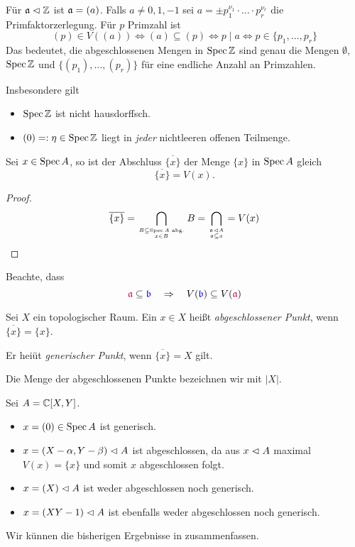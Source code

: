 \begin{beispiel}[$\Spec \Z$]
	Für $\mathfrak{a} \vartriangleleft \mathbb{Z}$ ist $\mathfrak{a} = (a)$. Falls $a \neq 0,1,-1$ sei
	$a = \pm p_1^{\nu_1} \cdot \dots \cdot p_r^{\nu_r}$ die 
	Primfaktorzerlegung. Für $p$ Primzahl ist
	\[
		(p) \in V((a)) \Leftrightarrow
		(a) \subseteq (p) \Leftrightarrow
		p \mid a \Leftrightarrow
		p \in \{p_1,\ldots, p_r\}
	\]
	Das bedeutet, die abgeschlossenen Mengen in $\Spec \Z$ sind genau die 
	Mengen $\emptyset$, $\Spec \Z$ und
	$\{(p_1), \ldots, (p_r)\}$ für eine endliche Anzahl an Primzahlen.
	
	Insbesondere gilt
	\begin{itemize}
	  \item $\Spec\Z$ ist nicht hausdorffsch.
	  \item $(0) =: \eta \in \operatorname{Spec}\mathbb{Z}$ liegt in \emph{jeder} nichtleeren 
	  	offenen Teilmenge.
	\end{itemize}
\end{beispiel}

\begin{lemma}
	Sei $x \in \operatorname{Spec} A$, so ist der Abschluss $\overline{\{x\}}$ der
	Menge $\{x\}$ in $\operatorname{Spec} A$ gleich
	\[\overline{\{x\}} = V(x).\]
\end{lemma}
\begin{proof}
	\[
		\overline{\{x\}} = 
		\bigcap_{B\subseteq \operatorname{Spec} A \text{ abg.}\atop x\in B} B
		= \bigcap_{\mathfrak{a}\vartriangleleft A\atop \mathfrak{a} \subseteq x}
		= V(x)
	\]
\end{proof}

\begin{bemerkung}
	Beachte, dass
	\[
		\textcolor{purple}{\mathfrak{a}} \subseteq \textcolor{blue}{\mathfrak b} \quad 
    \Rightarrow\quad
		V(\textcolor{blue}{\mathfrak b}) \subseteq V(\textcolor{purple}{\mathfrak{a}})
	\]
\end{bemerkung}

\begin{definition}
	Sei $X$ ein topologischer Raum.
	Ein $x\in X$ heißt \emph{abgeschlossener Punkt}, wenn
	$\overline{\{x\}} = \{x\}$.
	
	Er heiüt \emph{generischer Punkt}, wenn $\overline{\{x\}} = X$ gilt.
	
	Die Menge der abgeschlossenen Punkte bezeichnen wir mit
	$|X|$.
\end{definition}

\begin{beispiel}
	Sei $A = \mathbb{C}[X,Y]$. 
	\begin{itemize}
	  \item $x = (0) \in \operatorname{Spec} A$ ist generisch.
	  \item $x = (X-\alpha, Y-\beta) \vartriangleleft A$ ist abgeschlossen,
	  	da aus $x \vartriangleleft A$ maximal $V(x) = \{x\}$ und somit $x$ abgeschlossen
	  	folgt.
	  \item $x = (X) \vartriangleleft A$ ist weder abgeschlossen noch generisch.
    \item $x = (XY-1) \vartriangleleft A$ ist ebenfalls weder abgeschlossen noch
      generisch.
	\end{itemize}
  Wir künnen die bisherigen Ergebnisse in  zusammenfassen. 
\end{beispiel}

